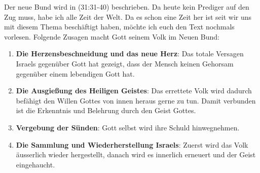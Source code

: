 \begin{otsblock}[Einführung]
        Der neue Bund wird in (31:31-40) beschrieben. Da heute kein Prediger auf den Zug muss, habe ich alle Zeit der Welt. 
        Da es schon eine Zeit her ist seit wir uns mit diesem Thema beschäftigt haben, möchte ich euch den Text nochmals vorlesen.
        Folgende Zusagen macht Gott seinem Volk im Neuen Bund:
        \begin{enumerate}
            \item \textbf{Die Herzensbeschneidung und das neue Herz}: Das totale Versagen Israels gegenüber Gott hat gezeigt, dass der Mensch keinen Gehorsam gegenüber einem lebendigen Gott hat.
            \item \textbf{Die Ausgießung des Heiligen Geistes}: Das errettete Volk wird dadurch befähigt den Willen Gottes von innen heraus gerne zu tun. Damit verbunden ist die Erkenntnis und Belehrung durch den Geist Gottes.
            \item \textbf{Vergebung der Sünden}: Gott selbst wird ihre Schuld hinwegnehmen.
            \item \textbf{Die Sammlung und Wiederherstellung Israels}:  Zuerst wird das Volk äusserlich wieder hergestellt, danach wird es innerlich erneuert und der Geist eingehaucht.
        \end{enumerate}
    \end{otsblock}

